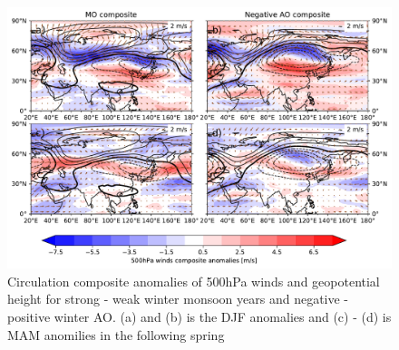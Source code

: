 \begin{figure}[htbp]
    \centering
    \includegraphics[width=\textwidth]{texfiles/figs/winter_MO_AO_composite_500h.pdf}
    \caption{Circulation composite anomalies of 500hPa winds and geopotential height for strong - weak winter monsoon years and negative - positive winter AO. (a) and (b) is the DJF anomalies and (c) - (d) is MAM anomilies in the following spring}
    \label{fig:mo_ao_composite_500hPa}
\end{figure}











